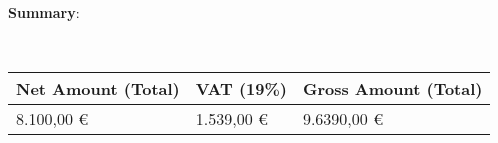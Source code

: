 \begin{Large} \textbf{Summary}: \end{Large} \\ \vspace*{11pt}
\begin{tabularx}{\textwidth}{X	X	X}
	\hline Net Amount (Total)  	& 	VAT (19\%)	 		& 	Gross Amount (Total)\\
	\hline 
	 8.100,00 \euro{} 			& 1.539,00 \euro 		& 	9.6390,00 \euro{} \\
	\hline 
	\hline 	
\end{tabularx}


